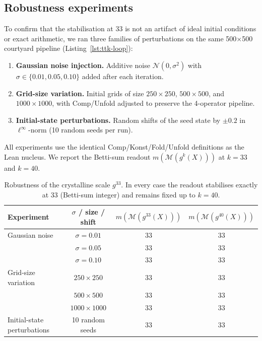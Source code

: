 \documentclass[12pt, oneside]{book}
\theoremstyle{plain}
\theoremstyle{definition}
\theoremstyle{remark}
\begin{document}
\subsection{Robustness experiments}
\label{subsec:robustness}

To confirm that the stabilisation at 33 is not an artifact of ideal initial conditions or exact arithmetic, we ran three families of perturbations on the same 500×500 courtyard pipeline (Listing~\ref{lst:ttk-loop}):

\begin{enumerate}
\item \textbf{Gaussian noise injection.} Additive noise \(\mathcal{N}(0,\sigma^2)\) with \(\sigma \in \{0.01, 0.05, 0.10\}\) added after each iteration.
\item \textbf{Grid-size variation.} Initial grids of size \(250\times250\), \(500\times500\), and \(1000\times1000\), with Comp/Unfold adjusted to preserve the 4-operator pipeline.
\item \textbf{Initial-state perturbations.} Random shifts of the seed state by \(\pm 0.2\) in \(\ell^\infty\)-norm (10 random seeds per run).
\end{enumerate}

All experiments use the identical Comp/Konst/Fold/Unfold definitions as the Lean nucleus. We report the Betti-sum readout \(m(\mathcal{M}(g^k(X)))\) at \(k=33\) and \(k=40\).

\begin{table}[htbp]
\centering
\caption{Robustness of the crystalline scale \(g^{33}\). In every case the readout stabilises exactly at 33 (Betti-sum integer) and remains fixed up to \(k=40\).}
\label{tab:robustness}
\begin{tabular}{lccc}
\toprule
Experiment & \(\sigma\) / size / shift & \(m(\mathcal{M}(g^{33}(X)))\) & \(m(\mathcal{M}(g^{40}(X)))\) \\
\midrule
Gaussian noise & \(\sigma=0.01\) & 33 & 33 \\
               & \(\sigma=0.05\) & 33 & 33 \\
               & \(\sigma=0.10\) & 33 & 33 \\
Grid-size variation & \(250\times250\) & 33 & 33 \\
                    & \(500\times500\) & 33 & 33 \\
                    & \(1000\times1000\) & 33 & 33 \\
Initial-state perturbations & 10 random seeds & 33 & 33 \\
\bottomrule
\end{tabular}
\end{table}
\end{document}
